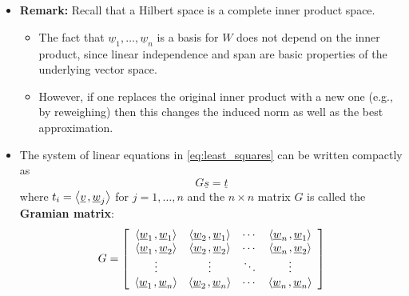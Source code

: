 \documentclass[11pt,twoside]{report}
\newcommand{\vecnot}{\underline}
\newcommand{\Herm}{{\mathrm{H}}}
\newcommand{\inner}[2]{{\left\langle #1 \mskip2mu , #2 \right\rangle}}
\begin{document}
\begin{itemize}
\item \textbf{Remark:} Recall that a Hilbert space is a complete inner product space.
\begin{itemize}
\item The fact that $\vecnot{w}_1, \dots, \vecnot{w}_n$ is a basis for $W$ does not depend on the  inner product, since linear independence and span are basic properties of the underlying vector space.%

\item  However, if one replaces the original inner product with a new one (e.g., by reweighing) then this changes the induced norm as well as the best approximation. 

\end{itemize}

\item The system of linear equations in \eqref{eq:least_squares}  can be written compactly as
\[
G \vecnot{s} = \vecnot{t} 
\]
where $t_i = \inner{ \vecnot{v} }{ \vecnot{w}_j }$ for $j = 1, \dots, n$ and  the $n \times n$ matrix $G$ is called the \textbf{Gramian matrix}:
\begin{equation*}
G = \left[ \begin{array}{cccc}
\inner{ \vecnot{w}_1 }{ \vecnot{w}_1 }
& \inner{ \vecnot{w}_2 }{ \vecnot{w}_1 } & \cdots
& \inner{ \vecnot{w}_n }{ \vecnot{w}_1 } \\
\inner{ \vecnot{w}_1 }{ \vecnot{w}_2 }
& \inner{ \vecnot{w}_2 }{ \vecnot{w}_2 } & \cdots
& \inner{ \vecnot{w}_n }{ \vecnot{w}_2 } \\
\vdots & \vdots & \ddots & \vdots \\
\inner{ \vecnot{w}_1 }{ \vecnot{w}_n }
& \inner{ \vecnot{w}_2 }{ \vecnot{w}_n } & \cdots
& \inner{ \vecnot{w}_n }{ \vecnot{w}_n }
\end{array} \right] \vspace{-1mm}
\end{equation*}










\end{itemize}
\end{document}
